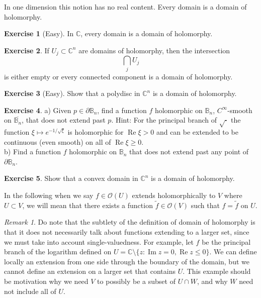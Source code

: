 \documentclass[12pt,openany]{book}
\renewcommand{\Re}{\operatorname{Re}}
\renewcommand{\Im}{\operatorname{Im}}
\newcommand{\C}{{\mathbb{C}}}
\newcommand{\bB}{{\mathbb{B}}}
\newcommand{\sO}{{\mathcal{O}}}
\theoremstyle{plain}
\theoremstyle{remark}
\newtheorem{remark}[thm]{Remark}
\theoremstyle{definition}
\newenvironment{exbox}{%
    \def\FrameCommand{\vrule width 1pt \relax\hspace {10pt}}%
    \MakeFramed {\advance \hsize -\width \FrameRestore }%
}{%
    \endMakeFramed
}
\theoremstyle{exercise}
\newtheorem{exercise}{Exercise}[section]
\theoremstyle{example}
\begin{document}
In one dimension this notion has no real content.  Every domain is a domain
of holomorphy.

\begin{exbox}
\begin{exercise}[Easy]
In $\C$, every domain is a domain of holomorphy.
\end{exercise}

\begin{exercise}
If $U_j \subset \C^n$ are domains of holomorphy, then the intersection
\begin{equation*}
\bigcap_{j} U_j
\end{equation*}
is either empty or every connected component is a domain of holomorphy.
\end{exercise}

\begin{exercise}[Easy]
Show that a polydisc in $\C^n$ is a domain of holomorphy.
\end{exercise}

\begin{exercise}
a) Given $p \in \partial \bB_n$, find a function $f$ holomorphic on
$\bB_n$,
$C^\infty$-smooth on $\overline{\bB_n}$, that does not extend past $p$.
Hint: For the principal branch of $\sqrt{\cdot}$ the function $\xi \mapsto
e^{-1/\sqrt{\xi}}$ is holomorphic for $\Re \xi > 0$ and can be extended to
be continuous (even smooth) on all of $\Re \xi \geq 0$.\\
b) Find a function $f$ holomorphic on $\bB_n$
that does not extend past any point of
$\partial \bB_n$.
\end{exercise}

\begin{exercise}
Show that a convex domain in $\C^n$ is a domain of holomorphy.
\end{exercise}
\end{exbox}

In the following when we say $f \in \sO(U)$ extends holomorphically to $V$ where
$U \subset V$, we will mean that there
exists a function $\widetilde{f} \in \sO(V)$ such that $f = \widetilde{f}$ on
$U$.

\begin{remark}
Do note that the subtlety of the definition of domain of holomorphy is that it does not
necessarily talk about functions extending to a larger set, since we must
take into account single-valuedness.  For example, let $f$ be the principal branch
of the logarithm defined on $U = \C \setminus \{ z : \Im z = 0, \Re z \leq 0
\}$.  We can define locally an extension from one side through the boundary
of the domain, but we cannot define an extension on a larger set that
contains $U$.  This example should be motivation why we need $V$ to possibly
be a subset of $U \cap W$, and why $W$ need not include all of $U$.
\end{remark}
\end{document}
